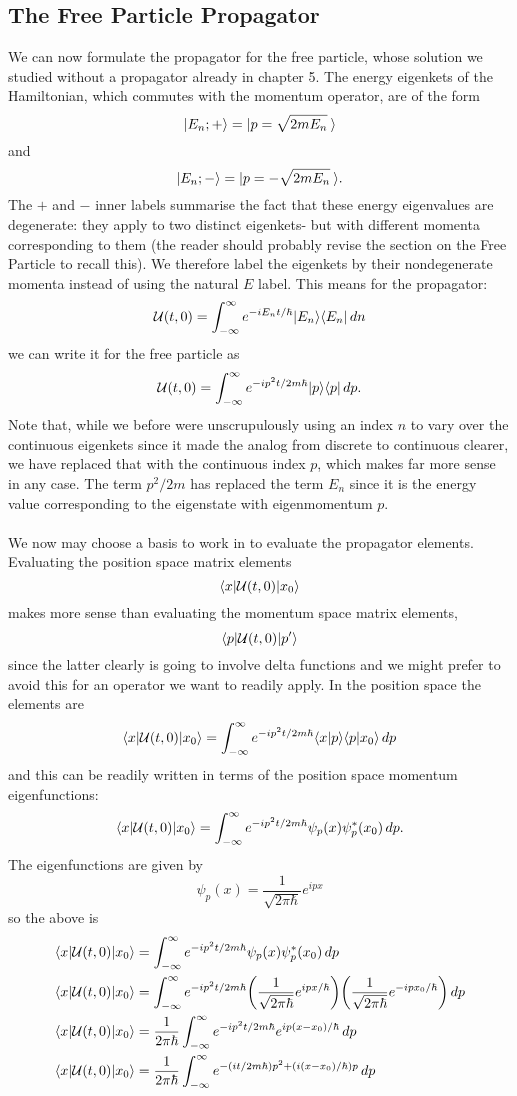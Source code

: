 \subsection{The Free Particle Propagator}
We can now formulate the propagator for the free particle, whose solution we studied without a propagator already in chapter 5. The energy eigenkets of the Hamiltonian, which commutes with the momentum operator, are of the form
$$
|E_{n};+\rangle=|p=\sqrt{2mE_{n}}\:\rangle
$$
and
$$
|E_{n};-\rangle=|p=-\sqrt{2mE_{n}}\:\rangle.
$$
The $+$ and $-$ inner labels summarise the fact that these energy eigenvalues are degenerate: they apply to two distinct eigenkets- but with different momenta corresponding to them (the reader should probably revise the section on the Free Particle to recall this). We therefore label the eigenkets by their nondegenerate momenta instead of using the natural $E$ label. This means for the propagator:
$$
\mathcal{U}(t,0)=\int_{-\infty}^{\infty} e^{-iE_{n}t/\hbar}|E_{n}\rangle\langle E_{n}|\,dn
$$
we can write it for the free particle as 
$$
\mathcal{U}(t,0)=\int_{-\infty}^{\infty} e^{-ip^{2}t/2m\hbar}|p\rangle\langle p|\,dp.
$$
Note that, while we before were unscrupulously using an index $n$ to vary over the continuous eigenkets since it made the analog from discrete to continuous clearer, we have replaced that with the continuous index $p$, which makes far more sense in any case. The term $p^2/2m$ has replaced the term $E_{n}$ since it is the energy value corresponding to the eigenstate with eigenmomentum $p$.
\\\\
We now may choose a basis to work in to evaluate the propagator elements. Evaluating the position space matrix elements
$$
\langle x|\mathcal{U}(t,0)|x_{0}\rangle
$$
makes more sense than evaluating the momentum space matrix elements, 
$$
\langle p|{\mathcal{U}(t,0)}|p'\rangle
$$ since the latter clearly is going to involve delta functions and we might prefer to avoid this for an operator we want to readily apply. In the position space the elements are
$$
\langle x|\mathcal{U}(t,0)|x_{0}\rangle=\int_{-\infty}^{\infty} e^{-ip^{2}t/2m\hbar}\langle x|p\rangle\langle p|x_{0}\rangle\,dp
$$
and this can be readily written in terms of the position space momentum eigenfunctions:
$$
\langle x|\mathcal{U}(t,0)|x_{0}\rangle=\int_{-\infty}^{\infty} e^{-ip^{2}t/2m\hbar} \psi_{p}(x)\psi^{\ast}_{p}(x_{0})\,dp.
$$
The eigenfunctions are given by 
$$
\psi_{p}(x)=\frac{1}{\sqrt{2\pi\hbar}}e^{ipx}
$$
so the above is
$$
\begin{aligned}
\langle x|\mathcal{U}(t,0)|x_{0}\rangle&=\int_{-\infty}^{\infty} e^{-ip^{2}t/2m\hbar} \psi_{p}(x)\psi^{\ast}_{p}(x_{0})\,dp\\
\langle x|\mathcal{U}(t,0)|x_{0}\rangle&=\int_{-\infty}^{\infty} e^{-ip^{2}t/2m\hbar} \biggl(\frac{1}{\sqrt{2\pi\hbar}}e^{ipx/\hbar}\biggr)\biggl(\frac{1}{\sqrt{2\pi\hbar}}e^{-ipx_{0}/\hbar}\biggr)\,dp\\
\langle x|\mathcal{U}(t,0)|x_{0}\rangle&=\frac{1}{2\pi\hbar}\int_{-\infty}^{\infty} e^{-ip^{2}t/2m\hbar} e^{ip(x-x_{0})/\hbar}\,dp\\
\langle x|\mathcal{U}(t,0)|x_{0}\rangle&=\frac{1}{2\pi\hbar}\int_{-\infty}^{\infty} e^{-(it/2m\hbar)p^{2}+(i(x-x_{0})/\hbar)p}\,dp\\
\end{aligned}
$$
